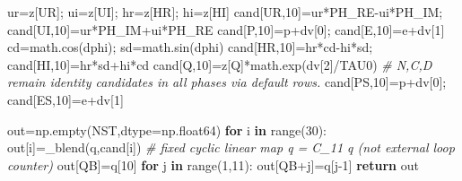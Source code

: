 \documentclass[
  a4paper,
]{article}
\newenvironment{Shaded}{}{}
\newcommand{\BuiltInTok}[1]{\textcolor[rgb]{0.00,0.50,0.00}{#1}}
\newcommand{\CommentTok}[1]{\textcolor[rgb]{0.38,0.63,0.69}{\textit{#1}}}
\newcommand{\ControlFlowTok}[1]{\textcolor[rgb]{0.00,0.44,0.13}{\textbf{#1}}}
\newcommand{\DecValTok}[1]{\textcolor[rgb]{0.25,0.63,0.44}{#1}}
\newcommand{\KeywordTok}[1]{\textcolor[rgb]{0.00,0.44,0.13}{\textbf{#1}}}
\newcommand{\NormalTok}[1]{#1}
\newcommand{\OperatorTok}[1]{\textcolor[rgb]{0.40,0.40,0.40}{#1}}
\begin{document}
\begin{Shaded}
\begin{Highlighting}[]
\NormalTok{    ur}\OperatorTok{=}\NormalTok{z[UR]}\OperatorTok{;}\NormalTok{ ui}\OperatorTok{=}\NormalTok{z[UI]}\OperatorTok{;}\NormalTok{ hr}\OperatorTok{=}\NormalTok{z[HR]}\OperatorTok{;}\NormalTok{ hi}\OperatorTok{=}\NormalTok{z[HI]}
\NormalTok{    cand[UR,}\DecValTok{10}\NormalTok{]}\OperatorTok{=}\NormalTok{ur}\OperatorTok{*}\NormalTok{PH\_RE}\OperatorTok{{-}}\NormalTok{ui}\OperatorTok{*}\NormalTok{PH\_IM}\OperatorTok{;}\NormalTok{ cand[UI,}\DecValTok{10}\NormalTok{]}\OperatorTok{=}\NormalTok{ur}\OperatorTok{*}\NormalTok{PH\_IM}\OperatorTok{+}\NormalTok{ui}\OperatorTok{*}\NormalTok{PH\_RE}
\NormalTok{    cand[P,}\DecValTok{10}\NormalTok{]}\OperatorTok{=}\NormalTok{p}\OperatorTok{+}\NormalTok{dv[}\DecValTok{0}\NormalTok{]}\OperatorTok{;}\NormalTok{ cand[E,}\DecValTok{10}\NormalTok{]}\OperatorTok{=}\NormalTok{e}\OperatorTok{+}\NormalTok{dv[}\DecValTok{1}\NormalTok{]}
\NormalTok{    cd}\OperatorTok{=}\NormalTok{math.cos(dphi)}\OperatorTok{;}\NormalTok{ sd}\OperatorTok{=}\NormalTok{math.sin(dphi)}
\NormalTok{    cand[HR,}\DecValTok{10}\NormalTok{]}\OperatorTok{=}\NormalTok{hr}\OperatorTok{*}\NormalTok{cd}\OperatorTok{{-}}\NormalTok{hi}\OperatorTok{*}\NormalTok{sd}\OperatorTok{;}\NormalTok{ cand[HI,}\DecValTok{10}\NormalTok{]}\OperatorTok{=}\NormalTok{hr}\OperatorTok{*}\NormalTok{sd}\OperatorTok{+}\NormalTok{hi}\OperatorTok{*}\NormalTok{cd}
\NormalTok{    cand[Q,}\DecValTok{10}\NormalTok{]}\OperatorTok{=}\NormalTok{z[Q]}\OperatorTok{*}\NormalTok{math.exp(dv[}\DecValTok{2}\NormalTok{]}\OperatorTok{/}\NormalTok{TAU0)}
    \CommentTok{\# N,C,D remain identity candidates in all phases via default rows.}
\NormalTok{    cand[PS,}\DecValTok{10}\NormalTok{]}\OperatorTok{=}\NormalTok{p}\OperatorTok{+}\NormalTok{dv[}\DecValTok{0}\NormalTok{]}\OperatorTok{;}\NormalTok{ cand[ES,}\DecValTok{10}\NormalTok{]}\OperatorTok{=}\NormalTok{e}\OperatorTok{+}\NormalTok{dv[}\DecValTok{1}\NormalTok{]}

\NormalTok{    out}\OperatorTok{=}\NormalTok{np.empty(NST,dtype}\OperatorTok{=}\NormalTok{np.float64)}
    \ControlFlowTok{for}\NormalTok{ i }\KeywordTok{in} \BuiltInTok{range}\NormalTok{(}\DecValTok{30}\NormalTok{): out[i]}\OperatorTok{=}\NormalTok{\_blend(q,cand[i])}
    \CommentTok{\# fixed cyclic linear map q\textquotesingle{} = C\_11 q (not external loop counter)}
\NormalTok{    out[QB]}\OperatorTok{=}\NormalTok{q[}\DecValTok{10}\NormalTok{]}
    \ControlFlowTok{for}\NormalTok{ j }\KeywordTok{in} \BuiltInTok{range}\NormalTok{(}\DecValTok{1}\NormalTok{,}\DecValTok{11}\NormalTok{): out[QB}\OperatorTok{+}\NormalTok{j]}\OperatorTok{=}\NormalTok{q[j}\OperatorTok{{-}}\DecValTok{1}\NormalTok{]}
    \ControlFlowTok{return}\NormalTok{ out}
\end{Highlighting}
\end{Shaded}
\end{document}
